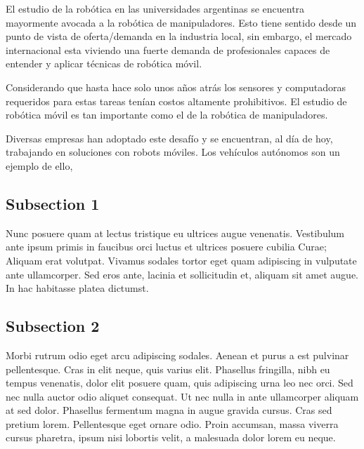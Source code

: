El estudio de la robótica en las universidades argentinas se encuentra mayormente avocada a la robótica de manipuladores. Esto tiene sentido desde un punto de vista de oferta/demanda en la industria local, sin embargo, el mercado internacional esta viviendo una fuerte demanda de profesionales capaces de entender y aplicar técnicas de robótica móvil.

Considerando que hasta hace solo unos años atrás los sensores y computadoras requeridos para estas tareas tenían costos altamente prohibitivos.
El estudio de robótica móvil es tan importante como el de la robótica de manipuladores.

Diversas empresas han adoptado este desafío y se encuentran, al día de hoy, trabajando en soluciones con robots móviles.
Los vehículos autónomos son un ejemplo de ello, 


\subsection{Subsection 1}

Nunc posuere quam at lectus tristique eu ultrices augue venenatis. Vestibulum ante ipsum primis in faucibus orci luctus et ultrices posuere cubilia Curae; Aliquam erat volutpat. Vivamus sodales tortor eget quam adipiscing in vulputate ante ullamcorper. Sed eros ante, lacinia et sollicitudin et, aliquam sit amet augue. In hac habitasse platea dictumst.


\subsection{Subsection 2}
Morbi rutrum odio eget arcu adipiscing sodales. Aenean et purus a est pulvinar pellentesque. Cras in elit neque, quis varius elit. Phasellus fringilla, nibh eu tempus venenatis, dolor elit posuere quam, quis adipiscing urna leo nec orci. Sed nec nulla auctor odio aliquet consequat. Ut nec nulla in ante ullamcorper aliquam at sed dolor. Phasellus fermentum magna in augue gravida cursus. Cras sed pretium lorem. Pellentesque eget ornare odio. Proin accumsan, massa viverra cursus pharetra, ipsum nisi lobortis velit, a malesuada dolor lorem eu neque.


